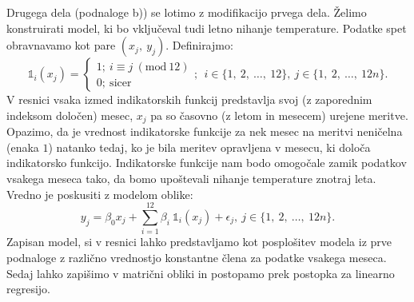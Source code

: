 \documentclass{article}
\begin{document}
Drugega dela (podnaloge b)) se lotimo z modifikacijo prvega dela. Želimo konstruirati model, ki bo vključeval tudi letno nihanje temperature. 
Podatke spet obravnavamo kot pare $(x_j,~y_j)$. Definirajmo:
$$
\mathds{1}_i(x_j)= \begin{cases}
    1;~ i \equiv j~(\text{mod}~12) \\
    0;~\text{sicer}
\end{cases};~~i \in \{1,~2,~\dots,~12\},~j \in \{1,~2,~\dots,~12n\}.
$$
V resnici vsaka izmed indikatorskih funkcij predstavlja svoj (z zaporednim indeksom določen) mesec, $x_j$ pa so časovno (z letom in mesecem) urejene meritve. 
Opazimo, da je vrednost indikatorske funkcije za nek mesec na meritvi neničelna (enaka $1$) natanko tedaj, ko je bila meritev opravljena v mesecu, ki določa indikatorsko funkcijo.
Indikatorske funkcije nam bodo omogočale zamik podatkov vsakega meseca tako, da bomo upoštevali nihanje temperature znotraj leta. 
Vredno je poskusiti z modelom oblike:
$$
    y_j = \beta_0 x_j + \sum_{i=1}^{12}{\beta_{i}~\mathds{1}_i(x_j)} + \epsilon_j,~j \in \{1,~2,~\dots,~12n\}.
$$
Zapisan model, si v resnici lahko predstavljamo kot posplošitev modela iz prve podnaloge z različno vrednostjo konstantne člena za podatke vsakega meseca. 
Sedaj lahko zapišimo v  matrični obliki in postopamo prek postopka za linearno regresijo. 
\end{document}

